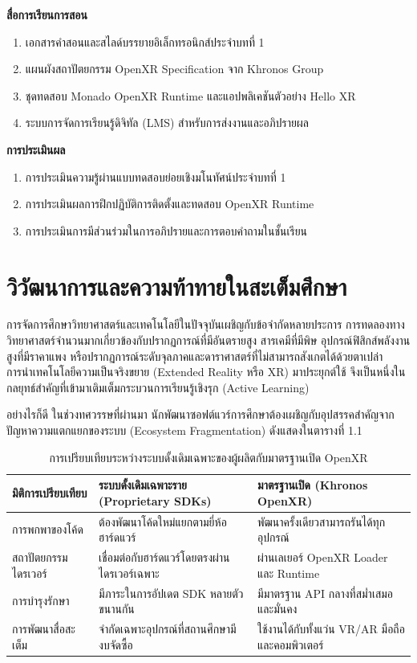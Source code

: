 \noindent\textbf{สื่อการเรียนการสอน}
\begin{enumerate}
    \item เอกสารคำสอนและสไลด์บรรยายอิเล็กทรอนิกส์ประจำบทที่ 1
    \item แผนผังสถาปัตยกรรม OpenXR Specification จาก Khronos Group
    \item ชุดทดสอบ Monado OpenXR Runtime และแอปพลิเคชันตัวอย่าง Hello XR
    \item ระบบการจัดการเรียนรู้ดิจิทัล (LMS) สำหรับการส่งงานและอภิปรายผล
\end{enumerate}

\noindent\textbf{การประเมินผล}
\begin{enumerate}
    \item การประเมินความรู้ผ่านแบบทดสอบย่อยเชิงมโนทัศน์ประจำบทที่ 1
    \item การประเมินผลการฝึกปฏิบัติการติดตั้งและทดสอบ OpenXR Runtime
    \item การประเมินการมีส่วนร่วมในการอภิปรายและการตอบคำถามในชั้นเรียน
\end{enumerate}

\newpage

\section{วิวัฒนาการและความท้าทายในสะเต็มศึกษา}

การจัดการศึกษาวิทยาศาสตร์และเทคโนโลยีในปัจจุบันเผชิญกับข้อจำกัดหลายประการ การทดลองทางวิทยาศาสตร์จำนวนมากเกี่ยวข้องกับปรากฏการณ์ที่มีอันตรายสูง สารเคมีที่มีพิษ อุปกรณ์ฟิสิกส์พลังงานสูงที่มีราคาแพง หรือปรากฏการณ์ระดับจุลภาคและดาราศาสตร์ที่ไม่สามารถสังเกตได้ด้วยตาเปล่า การนำเทคโนโลยีความเป็นจริงขยาย (Extended Reality หรือ XR) มาประยุกต์ใช้ จึงเป็นหนึ่งในกลยุทธ์สำคัญที่เข้ามาเติมเต็มกระบวนการเรียนรู้เชิงรุก (Active Learning)

อย่างไรก็ดี ในช่วงทศวรรษที่ผ่านมา นักพัฒนาซอฟต์แวร์การศึกษาต้องเผชิญกับอุปสรรคสำคัญจากปัญหาความแตกแยกของระบบ (Ecosystem Fragmentation) ดังแสดงในตารางที่ 1.1

\begin{table}[htbp]
\centering
\caption{การเปรียบเทียบระหว่างระบบดั้งเดิมเฉพาะของผู้ผลิตกับมาตรฐานเปิด OpenXR}
\label{tab:openxr_comparison}
\begin{tabularx}{\textwidth}{lYY}
\toprule
\textbf{มิติการเปรียบเทียบ} & \textbf{ระบบดั้งเดิมเฉพาะราย (Proprietary SDKs)} & \textbf{มาตรฐานเปิด (Khronos OpenXR)} \\
\midrule
การพกพาของโค้ด & ต้องพัฒนาโค้ดใหม่แยกตามยี่ห้อฮาร์ดแวร์ & พัฒนาครั้งเดียวสามารถรันได้ทุกอุปกรณ์ \\
สถาปัตยกรรมไดรเวอร์ & เชื่อมต่อกับฮาร์ดแวร์โดยตรงผ่านไดรเวอร์เฉพาะ & ผ่านเลเยอร์ OpenXR Loader และ Runtime \\
การบำรุงรักษา & มีภาระในการอัปเดต SDK หลายตัวขนานกัน & มีมาตรฐาน API กลางที่สม่ำเสมอและมั่นคง \\
การพัฒนาสื่อสะเต็ม & จำกัดเฉพาะอุปกรณ์ที่สถานศึกษามีงบจัดซื้อ & ใช้งานได้กับทั้งแว่น VR/AR มือถือ และคอมพิวเตอร์ \\
\bottomrule
\end{tabularx}
\end{table}

